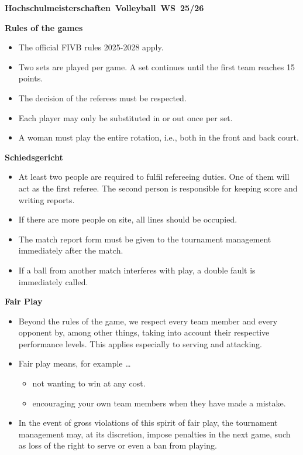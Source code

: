 \documentclass[
	headinclude=false,
	footinclude=false,
        12pt,
	]{scrartcl}
\begin{document}
    
 \newpage
\begin{center}
        {\LARGE\textbf{\mbox{Hochschulmeisterschaften Volleyball WS 25/26}}}
    \end{center}
    \vspace{1.5em}
{\Large\textbf{Rules of the games}}
\large
\begin{itemize}
    \item The official FIVB rules 2025-2028 apply.
    \item Two sets are played per game. A set continues until the first team reaches 15 points.
    \item The decision of the referees must be respected.
    \item Each player may only be substituted in or out once per set. 
    \item A woman must play the entire rotation, i.e., both in the front and back court. 
\end{itemize}   
\vspace{1cm}
 {\Large\textbf{Schiedsgericht}}
\begin{itemize}
   \item  At least two people are required to fulfil refereeing duties. One of them will act as the first referee. The second person is responsible for keeping score and writing reports.
   \item If there are more people on site, all lines should be occupied. 
   \item The match report form must be given to the tournament management immediately after the match.
    \item If a ball from another match interferes with play, a double fault is immediately called.
\end{itemize}  
\vspace{1cm}
 {\Large\textbf{Fair Play}}
\begin{itemize}
    \item Beyond the rules of the game, we respect every team member and every opponent by, among other things, taking into account their respective performance levels. This applies especially to serving and attacking.
    \item Fair play means, for example \ldots
    \begin{itemize}
        \item[\ldots] not wanting to win at any cost.
        \item[\ldots] encouraging your own team members when they have made a mistake.
    \end{itemize}
    \item In the event of gross violations of this spirit of fair play, the tournament management may, at its discretion, impose penalties in the next game, such as loss of the right to serve or even a ban from playing.
\end{itemize}    
\end{document}
